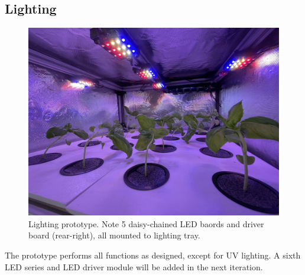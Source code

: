 \subsection{Lighting}

\begin{figure}[h!]
  \centering
  \includegraphics[width=\textwidth]{../assets/photos/prototype_lighting.png}
  \hfill
  \caption{Lighting prototype. Note 5 daisy-chained LED baords and driver board (rear-right), all mounted to lighting tray.}
  \label{fig:prototype_lighting}
\end{figure}

The prototype performs all functions as designed, except for UV lighting. A sixth LED series and LED driver module will be added in the next iteration.
